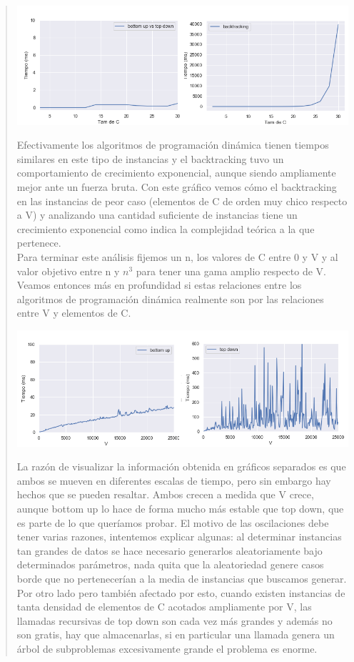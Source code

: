 \documentclass[7pt,a4paper]{article}
\begin{document}
\begin{verse}
\begin{center}
\includegraphics[scale=.4]{wc_bu_vs_td_graph.png}
\end{center}
Efectivamente los algoritmos de programación dinámica tienen tiempos similares en este tipo de instancias y el backtracking tuvo un comportamiento de crecimiento exponencial, aunque siendo ampliamente mejor ante un fuerza bruta.
Con este gráfico vemos cómo el backtracking en las instancias de peor caso (elementos de C de orden muy chico respecto a V)  y analizando una cantidad suficiente de instancias tiene un crecimiento exponencial como indica la complejidad teórica a la que pertenece.\\
Para terminar este análisis fijemos un n, los valores de C entre 0 y V y al valor objetivo entre n y $n^{3}$ para tener una gama amplio respecto de V. Veamos entonces más en profundidad si estas relaciones entre los algoritmos de programación dinámica realmente son por las relaciones entre V y elementos de C.\\
\begin{center}
\includegraphics[scale=.4]{wc2_bu_vs_td_graph.png}
\end{center}
La razón de visualizar la información obtenida en gráficos separados es que ambos se mueven en diferentes escalas de tiempo, pero sin embargo hay hechos que se pueden resaltar. Ambos crecen a medida que V crece, aunque bottom up lo hace de forma mucho más estable que top down, que es parte de lo que queríamos probar. El motivo de las oscilaciones debe tener varias razones, intentemos explicar algunas: al determinar instancias tan grandes de datos se hace necesario generarlos aleatoriamente bajo determinados parámetros,  nada quita que la aleatoriedad genere casos borde que no pertenecerían a la media de instancias que buscamos generar. Por otro lado pero también afectado por esto, cuando existen instancias de tanta densidad de elementos de C acotados ampliamente por V, las llamadas recursivas de top down son cada vez más grandes y además no son gratis, hay que almacenarlas, si en particular una llamada genera un árbol de subproblemas excesivamente grande el problema es enorme.

\end{verse}
\end{document}
